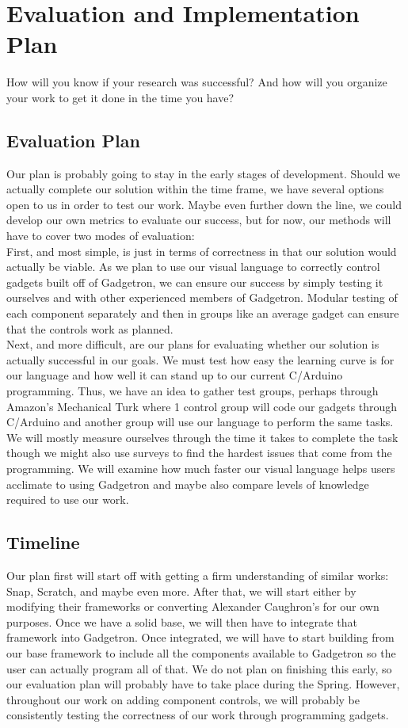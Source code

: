 \documentclass[12pt]{article}
\begin{document}
\section{Evaluation and Implementation Plan}
How will you know if your research was successful?  And how will you organize your work to get it done in the time you have?

\subsection{Evaluation Plan}
Our plan is probably going to stay in the early stages of development. Should we actually complete our solution within the time frame, we have several options open to us in order to test our work. Maybe even further down the line, we could develop our own metrics to evaluate our success, but for now, our methods will have to cover two modes of evaluation:\\[7pt]
First, and most simple, is just in terms of correctness in that our solution would actually be viable. As we plan to use our visual language to correctly control gadgets built off of Gadgetron, we can ensure our success by simply testing it ourselves and with other experienced members of Gadgetron. Modular testing of each component separately and then in groups like an average gadget can ensure that the controls work as planned.\\[7pt]
Next, and more difficult, are our plans for evaluating whether our solution is actually successful in our goals. We must test how easy the learning curve is for our language and how well it can stand up to our current C/Arduino programming. Thus, we have an idea to gather test groups, perhaps through Amazon's Mechanical Turk where 1 control group will code our gadgets through C/Arduino and another group will use our language to perform the same tasks. We will mostly measure ourselves through the time it takes to complete the task though we might also use surveys to find the hardest issues that come from the programming. We will examine how much faster our visual language helps users acclimate to using Gadgetron and maybe also compare levels of knowledge required to use our work.

\subsection{Timeline}
Our plan first will start off with getting a firm understanding of similar works: Snap, Scratch, and maybe even more. After that, we will start either by modifying their frameworks or converting Alexander Caughron's for our own purposes. Once we have a solid base, we will then have to integrate that framework into Gadgetron. Once integrated, we will have to start building from our base framework to include all the components available to Gadgetron so the user can actually program all of that. We do not plan on finishing this early, so our evaluation plan will probably have to take place during the Spring. However, throughout our work on adding component controls, we will probably be consistently testing the correctness of our work through programming gadgets.



\end{document}
